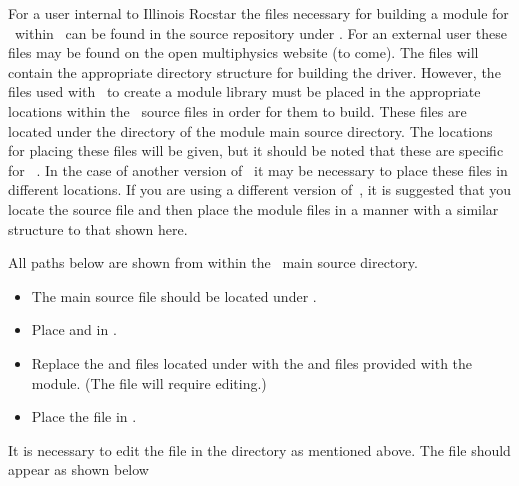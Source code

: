 
For a user internal to Illinois Rocstar the files necessary for building a module for \icofoam\, within \openfoamex\, can be found in the source repository under . For an external user these files may be found on the open multiphysics website (to come). The files will contain the appropriate directory structure for building the driver. However, the files used with \openfoam\, to create a module library must be placed in the appropriate locations within the \openfoam\, source files in order for them to build. These files are located under the  directory of the module main source directory. The locations for placing these files will be given, but it should be noted that these are specific for \openfoamex\, . In the case of another version of \openfoamex\, it may be necessary to place these files in different locations. If you are using a different version of \openfoamex\,, it is suggested that you locate the source file  and then place the module files in a manner with a similar structure to that shown here. 

All paths below are shown from within the \openfoamex\, main source directory.

\begin{itemize}
\item The main source file  should be located under \newline {}.
\item Place  and  in \newline {}.
\item Replace the  and  files located under \newline {} with the  and  files provided with the module. (The  file will require editing.)
\item Place the  file in .
\end{itemize}

It is necessary to edit the  file in the  directory as mentioned above. The  file should appear as shown below

